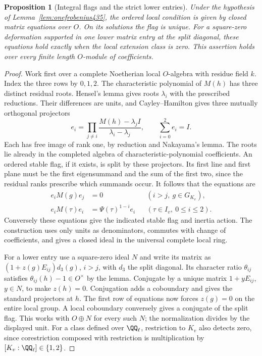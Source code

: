 \documentclass[a4paper,11pt]{article}
\newtheorem{proposition}{Proposition}[section]
\theoremstyle{definition}
\theoremstyle{remark}
\numberwithin{equation}{section}
\begin{document}
\begin{proposition}[Integral flags and the strict lower entries]\leavevmode
\label{prop:frobeniusflag435}
Under the hypothesis of Lemma~\ref{lem:onefrobenius435},
the ordered local condition is given by closed matrix equations
over \(O\). On its solutions the flag is unique. For a
square-zero deformation supported in one lower matrix entry at
the split diagonal, these equations hold exactly when the local
extension class is zero. This assertion holds over every finite
length \(O\)-module of coefficients.
\end{proposition}
\begin{proof}
Work first over a complete Noetherian local \(O\)-algebra
with residue field \(k\). Index the three rows by \(0,1,2\).
The characteristic polynomial of \(M(h)\) has three distinct
residual roots. Hensel's lemma gives roots \(\lambda_i\) with
the prescribed reductions. Their differences are units, and
Cayley--Hamilton gives three mutually orthogonal projectors
\[
   e_i=\prod_{j\ne i}
       \frac{M(h)-\lambda_j I}{\lambda_i-\lambda_j},
       \qquad \sum_{i=0}^2 e_i=I .
\]
Each has free image of rank one, by reduction and Nakayama's
lemma. The roots lie already in the completed algebra of
characteristic-polynomial coefficients. An ordered stable
flag, if it exists, is split by these projectors. Its first
line and first plane must be the first eigensummand and the
sum of the first two, since the residual ranks prescribe
which summands occur. It follows that the equations are
\[
 \begin{aligned}
    e_i M(g)e_j&=0 &&(i>j,\ g\in G_{K_v}),\\
    e_i M(\tau)e_i&=\Psi(\tau)^{1-i}e_i
                        &&(\tau\in I_v,\ 0\le i\le2).
 \end{aligned}
\]
Conversely these equations give the indicated stable flag and
inertia action. The construction uses only units as
denominators, commutes with change of coefficients, and gives
a closed ideal in the universal complete local ring.

For a lower entry use a square-zero ideal \(N\) and write its
matrix as \((1+z(g)E_{ij})d_3(g)\), \(i>j\), with \(d_3\)
the split diagonal. Its character ratio \(\theta_{ij}\)
satisfies \(\theta_{ij}(h)-1\in O^\times\) by the lemma.
Conjugate by a unique matrix \(1+yE_{ij}\), \(y\in N\), to
make \(z(h)=0\). Conjugation adds a coboundary and gives the
standard projectors at \(h\). The first row of equations now
forces \(z(g)=0\) on the entire local group. A local
coboundary conversely gives a conjugate of the split flag.
This works with \(O\oplus N\) for every such \(N\); the
normalization divides by the displayed unit. For a class
defined over \(\QQ_\ell\), restriction to \(K_v\) also
detects zero, since corestriction composed with restriction
is multiplication by \([K_v:\QQ_\ell]\in\{1,2\}\).
\end{proof}
\end{document}
